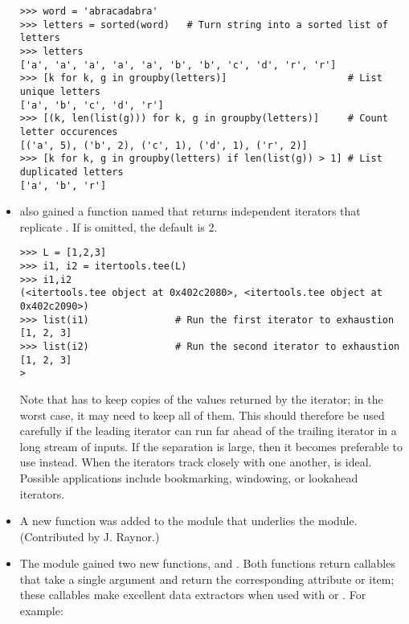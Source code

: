 \documentclass{howto}
\begin{document}
\begin{itemize}
\begin{verbatim}
>>> word = 'abracadabra'
>>> letters = sorted(word)   # Turn string into a sorted list of letters
>>> letters 
['a', 'a', 'a', 'a', 'a', 'b', 'b', 'c', 'd', 'r', 'r']
>>> [k for k, g in groupby(letters)]                     # List unique letters
['a', 'b', 'c', 'd', 'r']
>>> [(k, len(list(g))) for k, g in groupby(letters)]     # Count letter occurences
[('a', 5), ('b', 2), ('c', 1), ('d', 1), ('r', 2)]
>>> [k for k, g in groupby(letters) if len(list(g)) > 1] # List duplicated letters
['a', 'b', 'r']
\end{verbatim}

\item {} also gained a function named
 that returns  independent
iterators that replicate .  If  is omitted, the
default is 2.

\begin{verbatim}
>>> L = [1,2,3]
>>> i1, i2 = itertools.tee(L)
>>> i1,i2
(<itertools.tee object at 0x402c2080>, <itertools.tee object at 0x402c2090>)
>>> list(i1)               # Run the first iterator to exhaustion
[1, 2, 3]
>>> list(i2)               # Run the second iterator to exhaustion
[1, 2, 3]
>\end{verbatim}

Note that  has to keep copies of the values returned 
by the iterator; in the worst case, it may need to keep all of them.  
This should therefore be used carefully if the leading iterator
can run far ahead of the trailing iterator in a long stream of inputs.
If the separation is large, then it becomes preferable to use
 instead.  When the iterators track closely with one
another,  is ideal.  Possible applications include
bookmarking, windowing, or lookahead iterators.

\item A new  function was added to the
 module that underlies the  module.
(Contributed by J. Raynor.)

\item The  module gained two new functions, 
 and .
Both functions return callables that take a single argument and return
the corresponding attribute or item; these callables make excellent
data extractors when used with  or .
For example:


\end{itemize}
\end{document}
